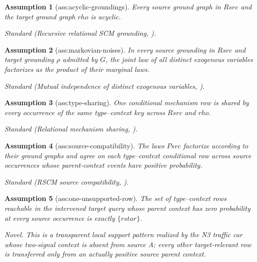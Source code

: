\documentclass{article}
\newtheorem{assumption}{Assumption}
\begin{document}
\begin{assumption}[ass:acyclic-groundings]\label{ass:acyclic-groundings}
Every source ground graph in \(Rsrc\) and the target ground graph \(rho\) is acyclic.
\par\smallskip\noindent\emph{Standard} (Recursive relational SCM grounding, \cite{EjazBareinboim2026RSCM}).
\end{assumption}

\begin{assumption}[ass:markovian-noises]\label{ass:markovian-noises}
In every source grounding in \(Rsrc\) and target grounding \(\rho\) admitted by \(G\), the joint law of all distinct exogenous variables factorizes as the product of their marginal laws.
\par\smallskip\noindent\emph{Standard} (Mutual independence of distinct exogenous variables, \cite{EjazBareinboim2026RSCM}).
\end{assumption}

\begin{assumption}[ass:type-sharing]\label{ass:type-sharing}
One conditional mechanism row is shared by every occurrence of the same type--context key across \(Rsrc\) and \(rho\).
\par\smallskip\noindent\emph{Standard} (Relational mechanism sharing, \cite{EjazBareinboim2026RSCM}).
\end{assumption}

\begin{assumption}[ass:source-compatibility]\label{ass:source-compatibility}
The laws \(Psrc\) factorize according to their ground graphs and agree on each type--context conditional row across source occurrences whose parent-context events have positive probability.
\par\smallskip\noindent\emph{Standard} (RSCM source compatibility, \cite{EjazBareinboim2026RSCM}).
\end{assumption}

\begin{assumption}[ass:one-unsupported-row]\label{ass:one-unsupported-row}
The set of type--context rows reachable in the intervened target query whose parent context has zero probability at every source occurrence is exactly \(\{rstar\}\).
\par\smallskip\noindent\emph{Novel.} This is a transparent local support pattern realized by the N3 traffic car whose two-signal context is absent from source A; every other target-relevant row is transferred only from an actually positive source parent context.
\end{assumption}
\end{document}

